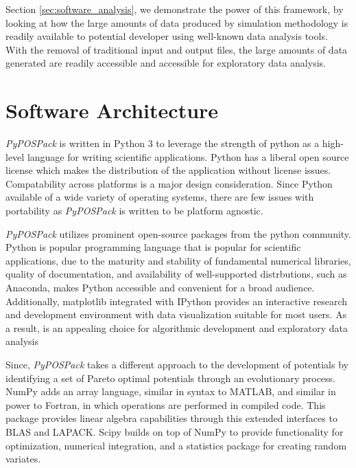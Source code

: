 Section \ref{sec:software_analysis}, we demonstrate the power of this framework, by looking at how the large amounts of data produced by simulation methodology is readily available to potential developer using well-known data analysis tools.  With the removal of traditional input and output files, the large amounts of data generated are readily accessible and accessible for exploratory data analysis.

\section{Software Architecture}
\label{sec:software_architecture}

\emph{PyPOSPack} is written in Python 3 to leverage the strength of python as a high-level language for writing scientific applications.  Python has a liberal open source license which makes the distribution of the application without license issues.  Compatability across platforms is a major design consideration.  Since Python available of a wide variety of operating systems, there are few issues with portability as \emph{PyPOSPack} is written to be platform agnostic.

\emph{PyPOSPack} utilizes prominent open-source packages from the python community.  Python is popular programming language that is popular for scientific applications, due to the maturity and stability of fundamental numerical libraries, quality of documentation, and availability of well-supported distrbutions, such as Anaconda\cite{python_anaconda}, makes Python accessible and convenient for a broad audience.  Additionally, matplotlib\cite{hunter2007_matplotlib} integrated with IPython\cite{} provides an interactive research and development environment with data visualization suitable for most users.  As a result, is an appealing choice for algorithmic development and exploratory data analysis\cite{dubois2007_python}

Since, \emph{PyPOSPack} takes a different approach to the development of potentials by identifying a set of Pareto optimal potentials through an evolutionary process.  NumPy\cite{walt2011_numpy} adds an array language, similar in syntax to MATLAB, and similar in power to Fortran, in which operations are performed in compiled code.  This package provides linear algebra capabilities through this extended interfaces to BLAS\cite{blas2002} and LAPACK\cite{anderson1990_lapack}.  Scipy\cite{jones_scipy} builds on top of NumPy to provide functionality for optimization, numerical integration, and a statistics package for creating random variates.

